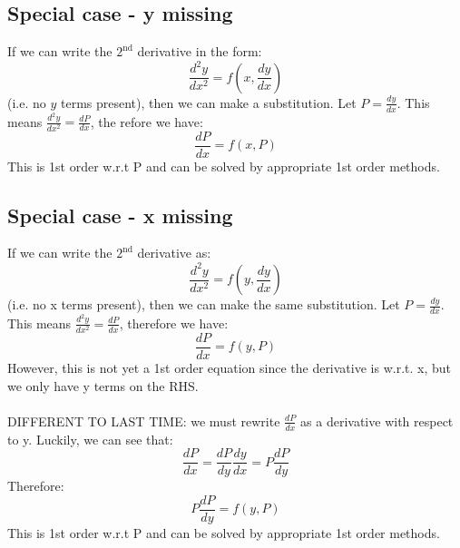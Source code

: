 \documentclass{scrartcl}
\begin{document}
\subsection{Special case - y missing}
If we can write the $ 2^{\textrm{nd}} $ derivative in the form:
\begin{equation}
\frac{d^{2}y}{dx^{2}} = f(x, \frac{dy}{dx})
\end{equation}
(i.e. no $ y $ terms present), then we can make a substitution. Let $ P = \frac{dy}{dx} $. This means $ \frac{d^{2}y}{dx^{2}} = \frac{dP}{dx} $, the
refore we have:
\begin{equation}
\frac{dP}{dx} = f(x, P)
\end{equation}
This is 1st order w.r.t P and can be solved by appropriate 1st order methods.

\subsection{Special case - x missing}
If we can write the $ 2^{\textrm{nd}} $ derivative as:
\begin{equation}
\frac{d^{2}y}{dx^{2}} = f(y, \frac{dy}{dx})
\end{equation}
(i.e. no x terms present), then we can make the same substitution. Let $ P = \frac{dy}{dx} $. This means $ \frac{d^{2}y}{dx^{2}} = \frac{dP}{dx} $, therefore we have:
\begin{equation}
\frac{dP}{dx} = f(y, P)
\end{equation}
However, this is not yet a 1st order equation since the derivative is w.r.t. x, but we only have y terms on the RHS.
\\\\
DIFFERENT TO LAST TIME: we must rewrite $ \frac{dP}{dx} $ as a derivative with respect to y. Luckily, we can see that:
\begin{equation}
\frac{dP}{dx} = \frac{dP}{dy}\frac{dy}{dx} = P\frac{dP}{dy}
\end{equation}
Therefore:
\begin{equation}
P\frac{dP}{dy} = f(y, P)
\end{equation}
This is 1st order w.r.t P and can be solved by appropriate 1st order methods.
\end{document}
